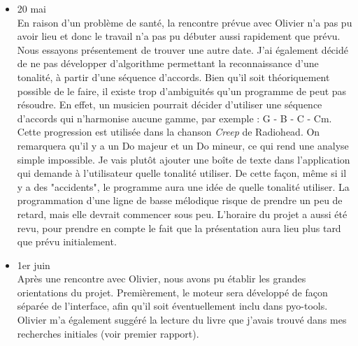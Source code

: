 \documentclass[letterpaper,12pt]{scrartcl}
\begin{document}
\begin{itemize}
	\item 20 mai \\
	En raison d'un problème de santé, la rencontre prévue avec Olivier n'a pas pu avoir lieu et donc le travail n'a pas pu débuter aussi rapidement que prévu. Nous essayons présentement de trouver une autre date. J'ai également décidé de ne pas développer d'algorithme permettant la reconnaissance d'une tonalité, à partir d'une séquence d'accords. Bien qu'il soit théoriquement possible de le faire, il existe trop d'ambiguités qu'un programme de peut pas résoudre. En effet, un musicien pourrait décider d'utiliser une séquence d'accords qui n'harmonise aucune gamme, par exemple : G - B - C - Cm. Cette progression est utilisée dans la chanson \textit{Creep} de Radiohead. On remarquera qu'il y a un Do majeur et un Do mineur, ce qui rend une analyse simple impossible. Je vais plutôt ajouter une boîte de texte dans l'application qui demande à l'utilisateur quelle tonalité utiliser. De cette façon, même si il y a des "accidents", le programme aura une idée de quelle tonalité utiliser. La programmation d'une ligne de basse mélodique risque de prendre un peu de retard, mais elle devrait commencer sous peu. L'horaire du projet a aussi été revu, pour prendre en compte le fait que la présentation aura lieu plus tard que prévu initialement.
	\item 1er juin\\
	Après une rencontre avec Olivier, nous avons pu établir les grandes orientations du projet. Premièrement, le moteur sera développé de façon séparée de l'interface, afin qu'il soit éventuellement inclu dans pyo-tools. Olivier m'a également suggéré la lecture du livre que j'avais trouvé dans mes recherches initiales (voir premier rapport). 


\end{itemize}
\end{document}
